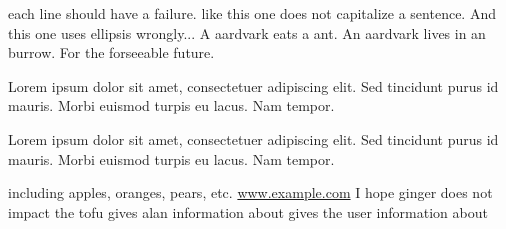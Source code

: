 each line should have a failure.  like this one does not capitalize a sentence.
And this one uses ellipsis wrongly...
A aardvark eats a ant.
An aardvark lives in an burrow.
For the forseeable future.
\caption{Lorem ipsum dolor sit amet, consectetuer adipiscing elit. Sed tincidunt purus id mauris. Morbi euismod turpis eu lacus. Nam tempor.}
\caption{\label{thelabel}Lorem ipsum dolor sit amet, consectetuer adipiscing elit. Sed tincidunt purus id mauris. Morbi euismod turpis eu lacus. Nam tempor.}
including apples, oranges, pears, etc.
\url{www.example.com}
I hope ginger does not impact the tofu
gives alan information about
gives the user information about
